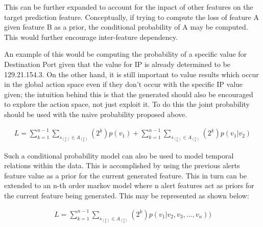 This can be further expanded to account for the inpact of other features on the target prediction feature. Conceptually, if trying to compute the loss of feature A given feature B as a prior, the conditional probability of A may be computed. This would further encourage inter-feature dependency. 

An example of this would be computing the probability of a specific value for Destination Port given that the value for IP is already determined to be 129.21.154.3. On the other hand, it is still important to value results which occur in the global action space even if they don't occur with the specific IP value given; the intuition behind this is that the generated should also be encouraged to explore the action space, not just exploit it. To do this the joint probability should be used with the naive probability proposed above. 

\begin{gather}
L = \sum_{k=1}^{n-1}\sum_{s_{{(^n_k)}} \in A_{(^n_k)}} (2^k)p(v_1) + \sum_{k=1}^{n-1}\sum_{s_{{(^n_k)}} \in A_{(^n_k)}} (2^k)p(v_1|v_2)
\end{gather}

Such a conditional probability model can also be used to model temporal relations within the data. This is accomplished by using the previous alerts feature value as a prior for the current generated feature. This in turn can be extended to an n-th order markov model where n alert features act as priors for the current feature being generated. This may be represented as shown below:

\begin{gather}
L =  \sum_{k=1}^{n-1}\sum_{s_{{(^n_k)}} \in A_{(^n_k)}} (2^k)p(v_1|v_2, v_3, ..., v_n))
\end{gather}

